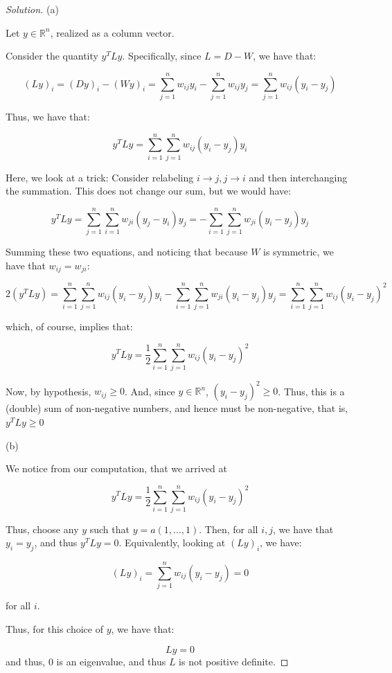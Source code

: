 \documentclass[10pt]{article}
\begin{document}
\begin{proof}[Solution]

(a)

Let $y \in \mathbb{R}^n$, realized as a column vector.

Consider the quantity $y^T L y$. Specifically, since $L = D - W$, we have that:

$$ (Ly)_i = (Dy)_i - (Wy)_i = \sum_{j=1}^n w_{ij} y_i - \sum_{j =1}^n w_{ij} y_j = \sum_{j=1}^n w_{ij} (y_i - y_j) $$

Thus, we have that:

$$ y^T Ly = \sum_{i=1}^n \sum_{j=1}^n  w_{ij} (y_i - y_j) y_i $$

Here, we look at a trick: Consider relabeling $i \to j, j \to i$ and then interchanging the summation. This does not change our sum, but we would have:

$$ y^T Ly = \sum_{j=1}^n \sum_{i=1}^n w_{ji} (y_j - y_i)y_j = - \sum_{i=1}^n \sum_{j=1}^n w_{ji} (y_i - y_j) y_j $$

Summing these two equations, and noticing that because $W$ is symmetric, we have that $w_{ij} = w_{ji}$:

$$2(y^T L y) = \sum_{i=1}^n \sum_{j=1}^n  w_{ij} (y_i - y_j) y_i -  \sum_{i=1}^n \sum_{j=1}^n w_{ji} (y_i - y_j) y_j =  \sum_{i=1}^n \sum_{j=1}^n w_{ij} (y_i - y_j)^2$$

which, of course, implies that:

$$y^TLy =  \frac{1}{2} \sum_{i=1}^n \sum_{j=1}^n w_{ij} (y_i - y_j)^2$$

Now, by hypothesis, $w_{ij} \geq 0$. And, since $y \in \mathbb{R}^n$, $(y_i - y_j)^2 \geq 0$. Thus, this is a (double) sum of non-negative numbers, and hence must be non-negative, that is, $y^T L y \geq 0$ 

(b)

We notice from our computation, that we arrived at

$$y^TLy =  \frac{1}{2} \sum_{i=1}^n \sum_{j=1}^n w_{ij} (y_i - y_j)^2$$

Thus, choose any $y$ such that $y = a(1,...,1)$. Then, for all $i,j$, we have that $y_i = y_j$, and thus $y^TLy = 0$. Equivalently, looking at $(Ly)_i$, we have:

$$ (Ly)_i =  \sum_{j=1}^n w_{ij} (y_i - y_j) = 0$$

for all $i$.

Thus, for this choice of $y$, we have that:

$$Ly = 0$$ and thus, $0$ is an eigenvalue, and thus $L$ is not positive definite.

\end{proof}
\end{document}
